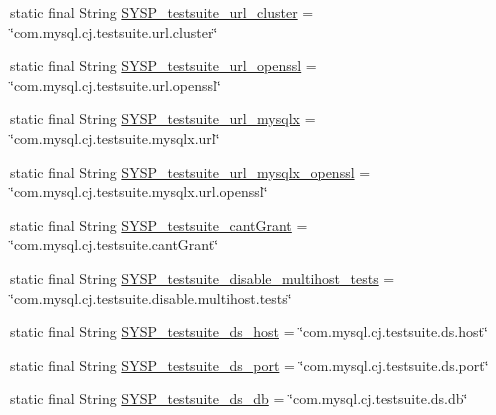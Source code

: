 \begin{DoxyCompactItemize}
\item 
static final String \mbox{\hyperlink{classcom_1_1mysql_1_1cj_1_1conf_1_1_property_definitions_a323dcb55dd68999da8bc238809002994}{S\+Y\+S\+P\+\_\+testsuite\+\_\+url\+\_\+cluster}} = \char`\"{}com.\+mysql.\+cj.\+testsuite.\+url.\+cluster\char`\"{}
\item 
static final String \mbox{\hyperlink{classcom_1_1mysql_1_1cj_1_1conf_1_1_property_definitions_a423748df889d74615c27c2d95cdc9644}{S\+Y\+S\+P\+\_\+testsuite\+\_\+url\+\_\+openssl}} = \char`\"{}com.\+mysql.\+cj.\+testsuite.\+url.\+openssl\char`\"{}
\item 
static final String \mbox{\hyperlink{classcom_1_1mysql_1_1cj_1_1conf_1_1_property_definitions_a3952b559e0b2ffabf6b1c21eccd179e7}{S\+Y\+S\+P\+\_\+testsuite\+\_\+url\+\_\+mysqlx}} = \char`\"{}com.\+mysql.\+cj.\+testsuite.\+mysqlx.\+url\char`\"{}
\item 
static final String \mbox{\hyperlink{classcom_1_1mysql_1_1cj_1_1conf_1_1_property_definitions_ac9827436f218e4b63f1f17fe18cdeb38}{S\+Y\+S\+P\+\_\+testsuite\+\_\+url\+\_\+mysqlx\+\_\+openssl}} = \char`\"{}com.\+mysql.\+cj.\+testsuite.\+mysqlx.\+url.\+openssl\char`\"{}
\item 
static final String \mbox{\hyperlink{classcom_1_1mysql_1_1cj_1_1conf_1_1_property_definitions_a179b590076fb472d0fbf14dced590910}{S\+Y\+S\+P\+\_\+testsuite\+\_\+cant\+Grant}} = \char`\"{}com.\+mysql.\+cj.\+testsuite.\+cant\+Grant\char`\"{}
\item 
static final String \mbox{\hyperlink{classcom_1_1mysql_1_1cj_1_1conf_1_1_property_definitions_a85a1aba99f66383176adcd8ec0949635}{S\+Y\+S\+P\+\_\+testsuite\+\_\+disable\+\_\+multihost\+\_\+tests}} = \char`\"{}com.\+mysql.\+cj.\+testsuite.\+disable.\+multihost.\+tests\char`\"{}
\item 
static final String \mbox{\hyperlink{classcom_1_1mysql_1_1cj_1_1conf_1_1_property_definitions_a86d432338d99475840565c3b46292d45}{S\+Y\+S\+P\+\_\+testsuite\+\_\+ds\+\_\+host}} = \char`\"{}com.\+mysql.\+cj.\+testsuite.\+ds.\+host\char`\"{}
\item 
static final String \mbox{\hyperlink{classcom_1_1mysql_1_1cj_1_1conf_1_1_property_definitions_a8574048752ea2217e6cba7c545012115}{S\+Y\+S\+P\+\_\+testsuite\+\_\+ds\+\_\+port}} = \char`\"{}com.\+mysql.\+cj.\+testsuite.\+ds.\+port\char`\"{}
\item 
static final String \mbox{\hyperlink{classcom_1_1mysql_1_1cj_1_1conf_1_1_property_definitions_a256636f3ea0d530350e5349db48392b6}{S\+Y\+S\+P\+\_\+testsuite\+\_\+ds\+\_\+db}} = \char`\"{}com.\+mysql.\+cj.\+testsuite.\+ds.\+db\char`\"{}

\end{DoxyCompactItemize}

